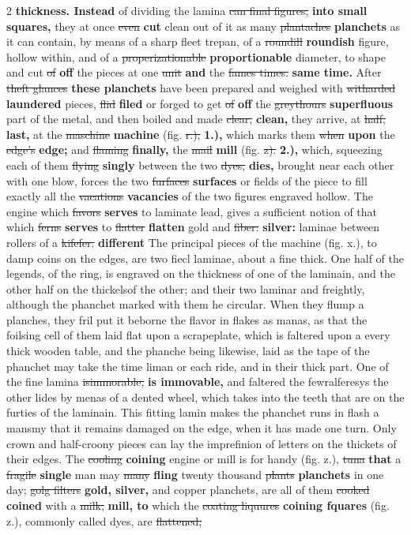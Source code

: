 \documentclass[10pt]{article}
\begin{document}
\begin{multicols}{2}
\textbf{thickness. Instead} of dividing the lamina \sout{can final figures,} \textbf{into small squares,} they at once \sout{even} \textbf{cut} clean out of it as many \sout{plantaches} \textbf{planchets} as it can contain, by means of a sharp fleet trepan, of a \sout{roundill} \textbf{roundish} figure, hollow within, and of a \sout{properizationable} \textbf{proportionable} diameter, to shape and cut \sout{of} \textbf{off} the pieces at one \sout{unit} \textbf{and} the \sout{fames times.} \textbf{same time.} After \sout{theft glances} \textbf{these planchets} have been prepared and weighed with \sout{witharded} \textbf{laundered} pieces, \sout{flid} \textbf{filed} or forged to get \sout{of} \textbf{off} the \sout{greythours} \textbf{superfluous} part of the metal, and then boiled and made \sout{clear,} \textbf{clean,} they arrive, at \sout{half,} \textbf{last,} at the \sout{maschine} \textbf{machine} (fig. \sout{r.),} \textbf{1.),} which marks them \sout{when} \textbf{upon} the \sout{edge's} \textbf{edge;} and \sout{flaming} \textbf{finally,} the \sout{mail} \textbf{mill} (fig. \sout{z).} \textbf{2.),} which, squeezing each of them \sout{flying} \textbf{singly} between the two \sout{dyes,} \textbf{dies,} brought near each other with one blow, forces the two \sout{furfaces} \textbf{surfaces} or fields of the piece to fill exactly all the \sout{vacations} \textbf{vacancies} of the two figures engraved hollow. The engine which \sout{favors} \textbf{serves} to laminate lead, gives a sufficient notion of that which \sout{ferns} \textbf{serves} to \sout{flatter} \textbf{flatten} gold and \sout{fiber:} \textbf{silver:} laminae between rollers of a \sout{kifefer.} \textbf{different} The principal pieces of the machine (fig. x.), to damp coins on the edges, are two fiecl laminae, about a fine thick. One half of the legends, of the ring, is engraved on the thickness of one of the laminain, and the other half on the thickelsof the other; and their two laminar and freightly, although the phanchet marked with them he circular. When they flump a planches, they fril put it beborne the flavor in flakes as manas, as that the foilsing cell of them laid flat upon a scrapeplate, which is faltered upon a every thick wooden table, and the phanche being likewise, laid as the tape of the phanchet may take the time liman or each ride, and in their thick part. One of the fine lamina \sout{isimmorable,} \textbf{is immovable,} and faltered the fewralferesys the other lides by menas of a dented wheel, which takes into the teeth that are on the furties of the laminain. This fitting lamin makes the phanchet runs in flash a mansmy that it remains damaged on the edge, when it has made one turn. Only crown and half-croony pieces can lay the imprefinion of letters on the thickets of their edges. The \sout{cooling} \textbf{coining} engine or mill is for handy (fig. z.), \sout{tuna} \textbf{that} a \sout{fragile} \textbf{single} man may \sout{many} \textbf{fling} twenty thousand \sout{plants} \textbf{planchets} in one day; \sout{golg filters} \textbf{gold, silver,} and copper planchets, are all of them \sout{cooked} \textbf{coined} with a \sout{milk,} \textbf{mill, to} which the \sout{coating liquures} \textbf{coining fquares} (fig. z.), commonly called dyes, are \sout{flattened;} 
\end{multicols}
\end{document}
